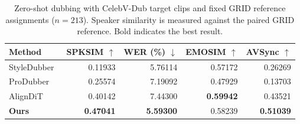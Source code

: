 \begin{table}[!t]
\centering
\caption{Zero-shot dubbing with CelebV-Dub target clips and fixed GRID reference assignments ($n=213$). Speaker similarity is measured against the paired GRID reference. Bold indicates the best result.}
\label{tab:zero_shot}
\footnotesize
\setlength{\tabcolsep}{3pt}
\begin{tabular}{@{}lrrrr@{}}
\toprule
Method & SPKSIM $\uparrow$ & WER (\%) $\downarrow$ & EMOSIM $\uparrow$ & AVSync $\uparrow$ \\
\midrule
StyleDubber~\cite{cong2024styledubber} & 0.11933 & 5.76114 & 0.57172 & 0.26269 \\
ProDubber~\cite{zhang2025produbber} & 0.25574 & 7.19092 & 0.47929 & 0.13703 \\
AlignDiT~\cite{choi2025aligndit} & 0.40142 & 7.44300 & \textbf{0.59942} & 0.43521 \\
\midrule
\textbf{Ours} & \textbf{0.47041} & \textbf{5.59300} & 0.58239 & \textbf{0.51039} \\
\bottomrule
\end{tabular}
\end{table}
